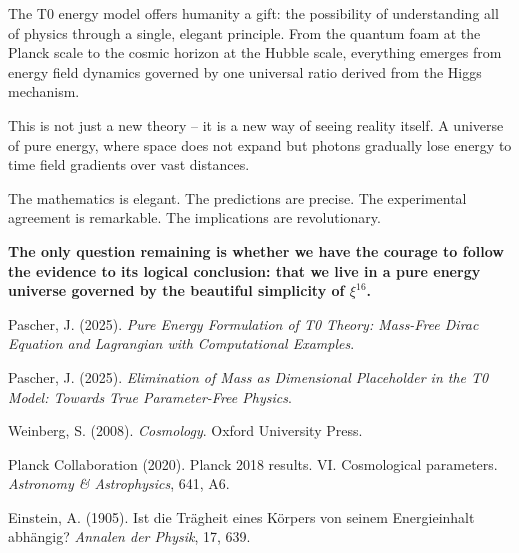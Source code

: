 \documentclass[12pt,a4paper]{article}
\begin{document}
	The T0 energy model offers humanity a gift: the possibility of understanding all of physics through a single, elegant principle. From the quantum foam at the Planck scale to the cosmic horizon at the Hubble scale, everything emerges from energy field dynamics governed by one universal ratio derived from the Higgs mechanism.
	
	This is not just a new theory -- it is a new way of seeing reality itself. A universe of pure energy, where space does not expand but photons gradually lose energy to time field gradients over vast distances.
	
	The mathematics is elegant. The predictions are precise. The experimental agreement is remarkable. The implications are revolutionary.
	
	\textbf{The only question remaining is whether we have the courage to follow the evidence to its logical conclusion: that we live in a pure energy universe governed by the beautiful simplicity of $\xi^{16}$.}
	
	\begin{thebibliography}{99}
		Pascher, J. (2025). \textit{Pure Energy Formulation of T0 Theory: Mass-Free Dirac Equation and Lagrangian with Computational Examples}.
		
		Pascher, J. (2025). \textit{Elimination of Mass as Dimensional Placeholder in the T0 Model: Towards True Parameter-Free Physics}.
		
		Weinberg, S. (2008). \textit{Cosmology}. Oxford University Press.
		
		Planck Collaboration (2020). Planck 2018 results. VI. Cosmological parameters. \textit{Astronomy \& Astrophysics}, 641, A6.
		
		Einstein, A. (1905). Ist die Trägheit eines Körpers von seinem Energieinhalt abhängig? \textit{Annalen der Physik}, 17, 639.
	\end{thebibliography}
	
\end{document}
